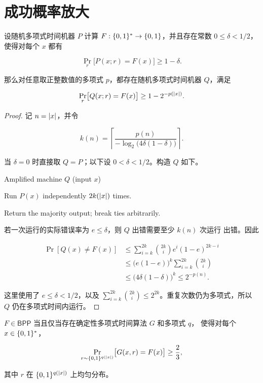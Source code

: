 \section{成功概率放大}

\begin{lemma}[放大引理]
  \label{lem:bpp-amplification}
  设随机多项式时间机器 $P$ 计算 $F:\{0,1\}^{*}\to\{0,1\}$，并且存在常数
  $0\leq\delta<1/2$，使得对每个 $x$ 都有

  \[
    \Pr_r\bigl[P(x;r)=F(x)\bigr]\geq1-\delta.
  \]

  那么对任意取正整数值的多项式 $p$，都存在随机多项式时间机器 $Q$，满足

  \[
    \Pr_r\bigl[Q(x;r)=F(x)\bigr]
      \geq 1-2^{-p(\lvert x\rvert)}.
  \]
\end{lemma}

\begin{proof}
  记 $n=\lvert x\rvert$，并令

  \[
    k(n)=\left\lceil
      \frac{p(n)}{-\log_2\!\bigl(4\delta(1-\delta)\bigr)}
    \right\rceil.
  \]

  当 $\delta=0$ 时直接取 $Q=P$；以下设 $0<\delta<1/2$。构造 $Q$ 如下。

  \begin{pseudocode}{Amplified machine $Q$ (input $x$)}
    \item Run $P(x)$ independently $2k(\lvert x\rvert)$ times.
    \item Return the majority output; break ties arbitrarily.
  \end{pseudocode}

  若一次运行的实际错误率为 $e\leq\delta$，则 $Q$ 出错需要至少 $k(n)$ 次运行
  出错。因此

  \begin{align*}
    \Pr[Q(x)\neq F(x)]
      &\leq \sum_{i=k}^{2k}\binom{2k}{i}e^i(1-e)^{2k-i} \\
      &\leq \bigl(e(1-e)\bigr)^k
          \sum_{i=k}^{2k}\binom{2k}{i} \\
      &\leq \bigl(4\delta(1-\delta)\bigr)^k
       \leq 2^{-p(n)}.
  \end{align*}

  这里使用了 $e\leq\delta<1/2$，以及
  $\sum_{i=k}^{2k}\binom{2k}{i}\leq2^{2k}$。重复次数仍为多项式，所以 $Q$
  仍在多项式时间内运行。
\end{proof}

\begin{corollary}[固定随机串的刻画]
  \label{cor:bpp-random-string-characterization}
  $F\in\mathsf{BPP}$ 当且仅当存在确定性多项式时间算法 $G$ 和多项式 $q$，
  使得对每个 $x\in\{0,1\}^{*}$，

  \[
    \Pr_{r\sim\{0,1\}^{q(\lvert x\rvert)}}
      \bigl[G(x,r)=F(x)\bigr]\geq\frac23,
  \]

  其中 $r$ 在 $\{0,1\}^{q(\lvert x\rvert)}$ 上均匀分布。
\end{corollary}

